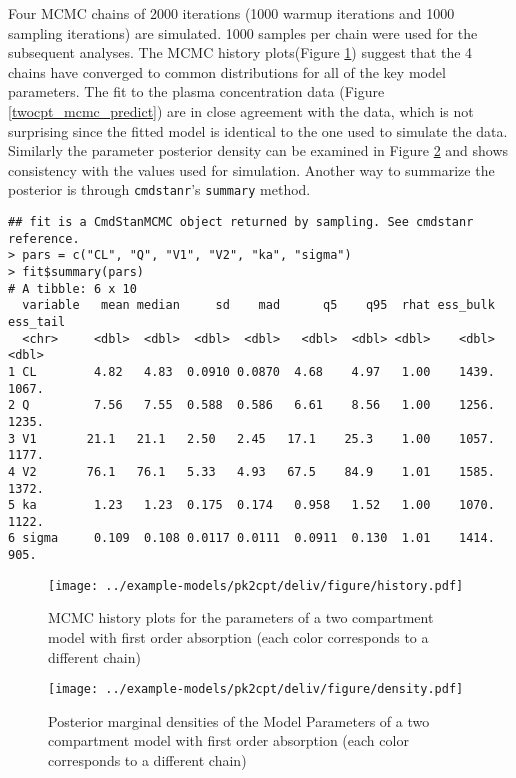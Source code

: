 \documentclass[12pt, reqno, oneside]{amsbook}
\numberwithin{equation}{chapter}
\numberwithin{figure}{chapter}
\numberwithin{table}{chapter}
\theoremstyle{remark}
\begin{document}
Four MCMC chains of 2000 iterations (1000 warmup iterations and 1000
sampling iterations) are simulated. 1000 samples per chain were used for the subsequent analyses.
The MCMC history plots(Figure \ref{twocpt_mcmc_history})
suggest that the 4 chains have converged to common distributions for
all of the key model parameters. The fit to the plasma concentration
data (Figure \ref{twocpt_mcmc_predict}) are in close agreement with the
data, which is not surprising since the fitted model is identical to
the one used to simulate the data. Similarly the parameter posterior
density can be examined in Figure \ref{twocpt_mcmc_posterior} and shows
consistency with the values used for simulation. Another way to
summarize the posterior is through \texttt{cmdstanr}'s \texttt{summary} method.

\begin{verbatim}
## fit is a CmdStanMCMC object returned by sampling. See cmdstanr reference.
> pars = c("CL", "Q", "V1", "V2", "ka", "sigma")
> fit$summary(pars)
# A tibble: 6 x 10
  variable   mean median     sd    mad      q5    q95  rhat ess_bulk ess_tail
  <chr>     <dbl>  <dbl>  <dbl>  <dbl>   <dbl>  <dbl> <dbl>    <dbl>    <dbl>
1 CL        4.82   4.83  0.0910 0.0870  4.68    4.97   1.00    1439.    1067.
2 Q         7.56   7.55  0.588  0.586   6.61    8.56   1.00    1256.    1235.
3 V1       21.1   21.1   2.50   2.45   17.1    25.3    1.00    1057.    1177.
4 V2       76.1   76.1   5.33   4.93   67.5    84.9    1.01    1585.    1372.
5 ka        1.23   1.23  0.175  0.174   0.958   1.52   1.00    1070.    1122.
6 sigma     0.109  0.108 0.0117 0.0111  0.0911  0.130  1.01    1414.     905.
\end{verbatim}

\begin{figure}[htbp]
\centering
\texttt{[image: ../example-models/pk2cpt/deliv/figure/history.pdf]}
\caption{\label{twocpt_mcmc_history}MCMC history plots for the parameters of a two compartment model with first order absorption (each color corresponds to a different chain)}
\end{figure}

\begin{figure}[htbp]
\centering
\texttt{[image: ../example-models/pk2cpt/deliv/figure/density.pdf]}
\caption{\label{twocpt_mcmc_posterior}Posterior marginal densities of the Model Parameters of a two compartment model with first order absorption (each color corresponds to a different chain)}
\end{figure}
\end{document}
